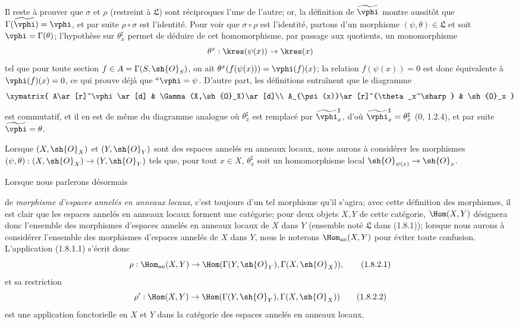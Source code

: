 Il reste à prouver que $\sigma$ et $\rho$ (restreint à $\mathfrak L$)
sont réciproques l'une de l'autre; or, la définition de
$\widetilde{\vphi}$ montre aussitôt que
$\Gamma(\widetilde{\vphi})=\vphi$, et par suite $\rho\circ\sigma$ est
l'identité. Pour voir que $\sigma\circ\rho$ est l'identité, partons
d'un morphisme $(\psi,\theta)\in\mathfrak L$ et soit
$\vphi=\Gamma(\theta)$; l'hypothèse sur $\theta_x^\sharp$ permet de
déduire de cet homomorphisme, par passage aux quotients, un
monomorphisme
\[
  \theta^x:\kres(\psi(x))\to\kres(x)
\]
tel que pour toute section $f\in A=\Gamma(S,\sh{O}_S)$, on ait
$\theta^x(f(\psi(x)))=\vphi(f)(x)$; la relation $f(\psi(x))=0$ est donc
équivalente à $\vphi(f)(x)=0$, ce qui prouve déjà que
${}^a\vphi=\psi$. D'autre part, les définitions entraînent que le
diagramme
\[
  \xymatrix{
    A\ar[r]^\vphi\ar[d] &
    \Gamma(X,\sh{O}_X)\ar[d]\\
    A_{\psi(x)}\ar[r]^{\theta_x^\sharp} &
    \sh{O}_x
  }
\]
est commutatif, et il en est de même du diagramme analogue où
$\theta_x^\sharp$ est remplacé par
$\widetilde{\vphi}_x^\sharp$, d'où
$\widetilde{\vphi}_x^\sharp=\theta_x^\sharp$ (0, 1.2.4), et par suite
$\widetilde{\vphi}=\theta$.

\begin{env}[1.8.2]
\label{ega2:addendum:I.1.8.2-fr}
Lorsque $(X,\sh{O}_X)$ et $(Y,\sh{O}_Y)$ sont des espaces annelés en
anneaux locaux, nous aurons à considérer les morphismes
$(\psi,\theta):(X,\sh{O}_X)\to(Y,\sh{O}_Y)$ tels que, pour tout
$x\in X$, $\theta_x^\sharp$ soit un homomorphisme local
$\sh{O}_{\psi(x)}\to\sh{O}_x$.

Lorsque nous parlerons désormais
de \emph{morphisme d'espaces annelés
en anneaux locaux}, c'est toujours d'un tel morphisme qu'il s'agira;
avec cette définition des morphismes, il est clair que les espaces
annelés en anneaux locaux forment une catégorie; pour deux objets
$X,Y$ de cette catégorie, $\Hom(X,Y)$ désignera donc l'ensemble des
morphismes d'espaces annelés en anneaux locaux de $X$ dans $Y$
(ensemble noté $\mathfrak L$ dans (1.8.1)); lorsque nous aurons à
considérer l'ensemble des morphismes d'espaces annelés de $X$ dans
$Y$, nous le noterons $\Hom_{\mathrm{an}}(X,Y)$ pour éviter toute
confusion. L'application (1.8.1.1) s'écrit donc
\begin{equation}
\label{ega2:addendum:I.1.8.2.1-fr}
  \rho:\Hom_{\mathrm{an}}(X,Y)
  \to\Hom(\Gamma(Y,\sh{O}_Y),\Gamma(X,\sh{O}_X)),
\tag{1.8.2.1}
\end{equation}
et sa restriction
\begin{equation}
\label{ega2:addendum:I.1.8.2.2-fr}
  \rho':\Hom(X,Y)
  \to\Hom(\Gamma(Y,\sh{O}_Y),\Gamma(X,\sh{O}_X))
\tag{1.8.2.2}
\end{equation}
est une application fonctorielle en $X$ et $Y$ dans la catégorie des
espaces annelés en anneaux locaux.
\end{env}

